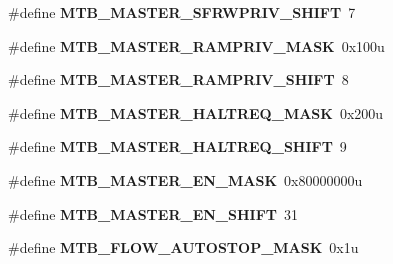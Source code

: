 \begin{DoxyCompactItemize}
\item 
\hypertarget{group___m_t_b___register___masks_gae6e1de627837f38d2a5cab79cf13f295}{}\#define {\bfseries M\+T\+B\+\_\+\+M\+A\+S\+T\+E\+R\+\_\+\+S\+F\+R\+W\+P\+R\+I\+V\+\_\+\+S\+H\+I\+F\+T}~7\label{group___m_t_b___register___masks_gae6e1de627837f38d2a5cab79cf13f295}

\item 
\hypertarget{group___m_t_b___register___masks_ga93d1c4a852b65c4f91c847930414e3bf}{}\#define {\bfseries M\+T\+B\+\_\+\+M\+A\+S\+T\+E\+R\+\_\+\+R\+A\+M\+P\+R\+I\+V\+\_\+\+M\+A\+S\+K}~0x100u\label{group___m_t_b___register___masks_ga93d1c4a852b65c4f91c847930414e3bf}

\item 
\hypertarget{group___m_t_b___register___masks_gadd17751eced675ec41c38640f7922cc3}{}\#define {\bfseries M\+T\+B\+\_\+\+M\+A\+S\+T\+E\+R\+\_\+\+R\+A\+M\+P\+R\+I\+V\+\_\+\+S\+H\+I\+F\+T}~8\label{group___m_t_b___register___masks_gadd17751eced675ec41c38640f7922cc3}

\item 
\hypertarget{group___m_t_b___register___masks_gaee5817b3564e9ce65cc9c26af3055978}{}\#define {\bfseries M\+T\+B\+\_\+\+M\+A\+S\+T\+E\+R\+\_\+\+H\+A\+L\+T\+R\+E\+Q\+\_\+\+M\+A\+S\+K}~0x200u\label{group___m_t_b___register___masks_gaee5817b3564e9ce65cc9c26af3055978}

\item 
\hypertarget{group___m_t_b___register___masks_ga5f262014ec318bcd2273ade4e32ab362}{}\#define {\bfseries M\+T\+B\+\_\+\+M\+A\+S\+T\+E\+R\+\_\+\+H\+A\+L\+T\+R\+E\+Q\+\_\+\+S\+H\+I\+F\+T}~9\label{group___m_t_b___register___masks_ga5f262014ec318bcd2273ade4e32ab362}

\item 
\hypertarget{group___m_t_b___register___masks_gab9f73fe136cde10e51b5192c621aaf7d}{}\#define {\bfseries M\+T\+B\+\_\+\+M\+A\+S\+T\+E\+R\+\_\+\+E\+N\+\_\+\+M\+A\+S\+K}~0x80000000u\label{group___m_t_b___register___masks_gab9f73fe136cde10e51b5192c621aaf7d}

\item 
\hypertarget{group___m_t_b___register___masks_ga48c3714ccdd23d6fae7221619e7a3b29}{}\#define {\bfseries M\+T\+B\+\_\+\+M\+A\+S\+T\+E\+R\+\_\+\+E\+N\+\_\+\+S\+H\+I\+F\+T}~31\label{group___m_t_b___register___masks_ga48c3714ccdd23d6fae7221619e7a3b29}

\item 
\hypertarget{group___m_t_b___register___masks_ga9a44f1be981682cb9519f33e95b94644}{}\#define {\bfseries M\+T\+B\+\_\+\+F\+L\+O\+W\+\_\+\+A\+U\+T\+O\+S\+T\+O\+P\+\_\+\+M\+A\+S\+K}~0x1u\label{group___m_t_b___register___masks_ga9a44f1be981682cb9519f33e95b94644}


\end{DoxyCompactItemize}
